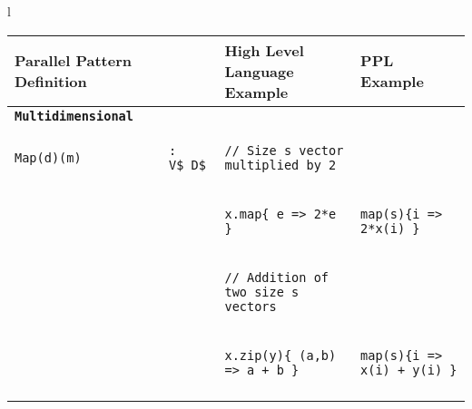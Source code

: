\begin{figure*}
\small\centering
\begin{tabular}{l}
{\small\begin{tabular}{ll|l|l}
\noalign{\hrule height 1.5pt}
{\bf Parallel Pattern Definition} & & {\bf High Level Language Example} & {\bf PPL Example} \\ \hline

{%
\scriptsize{\textbf{\texttt{Multidimensional}}}
} & & \\
\vspace{-0.075cm}
{\begin{lstlisting}[numbers=none,mathescape=true]
Map(d)(m)\end{lstlisting}} &
{\begin{lstlisting}[numbers=none,mathescape=true]
: V$_D$
\end{lstlisting}} &

{\begin{lstlisting}[numbers=none,mathescape=true]
// Size s vector multiplied by 2
\end{lstlisting}} & {} \\

\vspace{-0.075cm}
{} & {} & {\begin{lstlisting}[numbers=none,mathescape=true]
x.map{ e => 2*e }
\end{lstlisting}} &
{\begin{lstlisting}[numbers=none,mathescape=true]
map(s){i => 2*x(i) }
\end{lstlisting}} \\
\vspace{-0.075cm}

{} & {} & {\begin{lstlisting}[numbers=none,mathescape=true]
// Addition of two size s vectors
\end{lstlisting}} & {} \\
\vspace{-0.075cm}

{} & {} & {\begin{lstlisting}[numbers=none,mathescape=true]
x.zip(y){ (a,b) => a + b }
\end{lstlisting}} &
{\begin{lstlisting}[numbers=none,mathescape=true]
map(s){i => x(i) + y(i) }
\end{lstlisting}} \\
\vspace{-0.25cm}


\end{tabular}}
\end{tabular}
\end{figure*}
